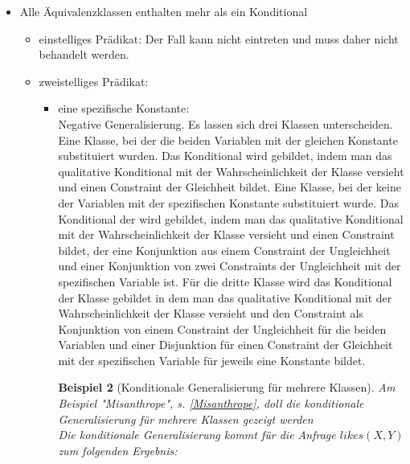 \documentclass[draft]{scrreprt}
\newtheorem{Bsp}{Beispiel}[section]
\begin{document}
\begin{itemize}
\begin{itemize}
\begin{Bsp}[Konditionale Generalisierung am Beispiel]
		\end{Bsp}
		\item zweistelliges Prädikat:\\ 
		Dieser Fall ist nicht zu betrachten, da die Klassen bei zweistelligen Prädikaten jeweils mindestens zwei Elemente enthalten.
			\end{itemize}
	\item Alle Äquivalenzklassen enthalten mehr als ein Konditional
	\begin{itemize}
		\item einstelliges Prädikat: Der Fall kann nicht eintreten und muss daher nicht behandelt werden.  \\
		\item zweistelliges Prädikat:\\
		\begin{itemize}
			\item eine spezifische Konstante:\\
		Negative Generalisierung. Es lassen sich drei Klassen unterscheiden. Eine Klasse, bei der die beiden Variablen mit der gleichen Konstante substituiert wurden. Das Konditional wird gebildet, indem man das qualitative Konditional mit der Wahrscheinlichkeit der Klasse versieht und einen Constraint der Gleichheit bildet. Eine Klasse, bei der keine der Variablen mit der spezifischen Konstante substituiert wurde. Das Konditional der wird gebildet, indem man das qualitative Konditional mit der Wahrscheinlichkeit der Klasse versieht und einen Constraint bildet, der eine Konjunktion aus einem Constraint der Ungleichheit und einer Konjunktion von zwei Constraints der Ungleichheit mit der spezifischen Variable ist. Für die dritte Klasse wird das Konditional der Klasse gebildet in dem man das qualitative Konditional mit der Wahrscheinlichkeit der Klasse versieht und den Constraint als Konjunktion von einem Constraint der Ungleichheit für die beiden Variablen und einer Disjunktion für einen Constraint der Gleichheit mit der spezifischen Variable für jeweils eine Konstante bildet.\\
			\begin{Bsp}[Konditionale Generalisierung für mehrere Klassen] 
				Am Beispiel "{}Misanthrope"{}, s. \ref{Misanthrope}, doll die konditionale Generalisierung für mehrere Klassen gezeigt werden\\
				Die konditionale Generalisierung kommt für die Anfrage $ likes(X,Y) $ zum folgenden Ergebnis:\\
				

\end{Bsp}
\end{itemize}
\end{itemize}
\end{itemize}
\end{document}
